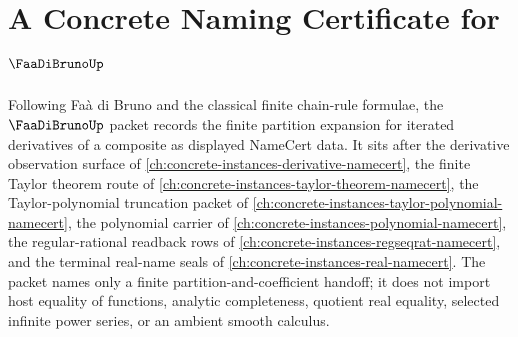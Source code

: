 \chapter{A Concrete Naming Certificate for $\FaaDiBrunoUp$}
\label{ch:concrete-instances-faa-di-bruno-namecert}

Following Faà di Bruno and the classical finite chain-rule formulae, the $\FaaDiBrunoUp$ packet records the finite partition expansion for iterated derivatives of a composite as displayed NameCert data. It sits after the derivative observation surface of \autoref{ch:concrete-instances-derivative-namecert}, the finite Taylor theorem route of \autoref{ch:concrete-instances-taylor-theorem-namecert}, the Taylor-polynomial truncation packet of \autoref{ch:concrete-instances-taylor-polynomial-namecert}, the polynomial carrier of \autoref{ch:concrete-instances-polynomial-namecert}, the regular-rational readback rows of \autoref{ch:concrete-instances-regseqrat-namecert}, and the terminal real-name seals of \autoref{ch:concrete-instances-real-namecert}. The packet names only a finite partition-and-coefficient handoff; it does not import host equality of functions, analytic completeness, quotient real equality, selected infinite power series, or an ambient smooth calculus.

